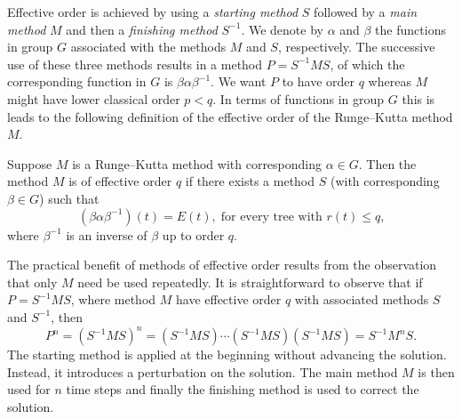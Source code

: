 Effective order is achieved by using a \emph{starting method} $S$
followed by a \emph{main method} $M$
and then a \emph{finishing method} $S^{-1}$.
We denote by $\alpha$ and $\beta$ the functions in group $G$ associated with the methods $M$ and $S$, respectively.
The successive use of these three methods results in a method $P = S^{-1}MS$, of which the corresponding function in $G$ is $\beta\alpha\beta^{-1}$.
We want $P$ to have order $q$ whereas $M$ might have lower classical
order $p < q$.
In terms of functions in group $G$ this is leads to the following definition of the effective order of the Runge--Kutta method $M$.
\begin{definition}\cite{Butcher1987_book}\label{def:Effective_order}
  Suppose $M$ is a Runge--Kutta method with corresponding $\alpha \in G$.
  Then the method $M$ is of effective order $q$ if there exists a method
  $S$ (with corresponding $\beta \in G$) such that
	\begin{equation}\label{eq:Effective_order_1}
		(\beta\alpha\beta^{-1})(t) = E(t), \; \text{for every tree with $r(t) \leq q$,}
	\end{equation}
        where $\beta^{-1}$ is an inverse of $\beta$ up to order $q$.
\end{definition}
The practical benefit of methods of effective order results from the
observation that only $M$ need be used repeatedly.
It is straightforward to observe that if $P=S^{-1}MS$, where method 
$M$ have effective order $q$ with associated methods $S$ and $S^{-1}$, then
\begin{displaymath}
	P^n = (S^{-1}MS)^n = (S^{-1}MS) \cdots (S^{-1}MS) (S^{-1}MS) = S^{-1} M^n S.
\end{displaymath}
The starting method is applied at the beginning without advancing the
solution.
Instead, it introduces a perturbation on the solution.
The main method \( M \) is then used for \( n \) time steps and finally the
finishing method is used to correct the solution.


